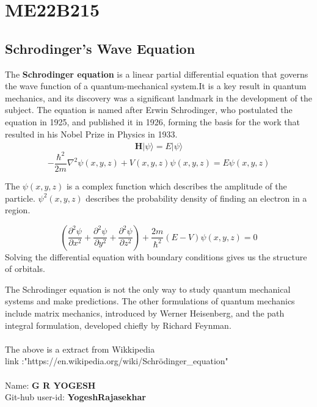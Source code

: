 \section{ME22B215}
\subsection{Schrodinger's Wave Equation }
The \textbf{Schrodinger equation} is a linear partial differential equation that governs the wave function of a quantum-mechanical system.It is a key result in quantum mechanics, and its discovery was a significant landmark in the development of the subject. The equation is named after Erwin Schrodinger, who postulated the equation in 1925, and published it in 1926, forming the basis for the work that resulted in his Nobel Prize in Physics in 1933.
\begin{equation}
    \hat{\textbf{H}} \bigl| \psi\rangle = E\bigl| \psi\rangle
\end{equation}
\begin{equation}
-\frac{\hbar^2}{2m}\nabla^2\psi(x,y,z)+V(x,y,z)\psi(x,y,z)=E\psi(x,y,z)
\end{equation}

The $\psi(x,y,z)$ is a complex function which describes the amplitude of the particle. $\psi^2(x,y,z)$ describes the probability density of finding an electron in a region.

\begin{equation}
(\frac{\partial^2 \psi}{\partial x^2}+\frac{\partial^2 \psi}{\partial y^2}+\frac{\partial^2 \psi}{\partial z^2})+\frac{2m}{\hbar^2}(E-V)\psi(x,y,z)=0
\end{equation}
Solving the differential equation with boundary conditions gives us the structure of orbitals.

The Schrodinger equation is not the only way to study quantum mechanical systems and make predictions. The other formulations of quantum mechanics include matrix mechanics, introduced by Werner Heisenberg, and the path integral formulation, developed chiefly by Richard Feynman.
\\\\
The above is a extract from Wikkipedia \\
link :"https://en.wikipedia.org/wiki/Schr\"{o}dinger\_equation"
\\\\
Name: \textbf{G R YOGESH} \\
Git-hub user-id: \textbf{YogeshRajasekhar}
